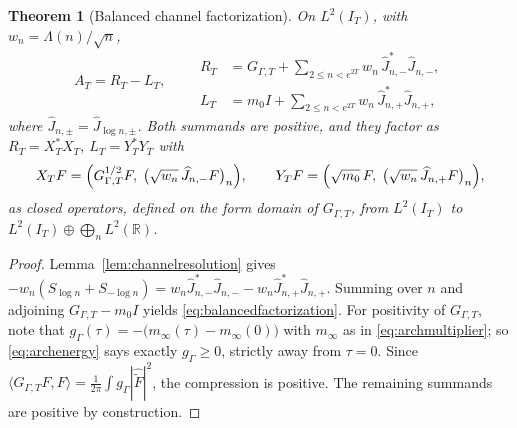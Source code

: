 \documentclass[11pt]{amsart}
\newtheorem{theorem}{Theorem}[section]
\theoremstyle{definition}
\theoremstyle{remark}
\newcommand{\R}{\mathbb R}
\begin{document}
\begin{theorem}[Balanced channel factorization]\label{thm:balancedfactorization}
On \(L^2(I_T)\), with \(w_n=\Lambda(n)/\sqrt n\),
\begin{equation}\label{eq:balancedfactorization}
 A_T=R_T-L_T,
 \qquad
 \begin{aligned}
 R_T&=G_{\Gamma,T}+\sum_{2\le n<e^{2T}}w_n\,
      \widehat J_{n,-}^*\widehat J_{n,-},\\
 L_T&=m_0I+\sum_{2\le n<e^{2T}}w_n\,
      \widehat J_{n,+}^*\widehat J_{n,+},
 \end{aligned}
\end{equation}
where \(\widehat J_{n,\pm}=\widehat J_{\log n,\pm}\).  Both summands are
positive, and they factor as \(R_T=X_T^*X_T\), \(L_T=Y_T^*Y_T\) with
\begin{equation}\label{eq:referenceloadcolumns}
 X_TF=\Bigl(G_{\Gamma,T}^{1/2}F,\;
      \bigl(\sqrt{w_n}\,\widehat J_{n,-}F\bigr)_n\Bigr),
 \qquad
 Y_TF=\Bigl(\sqrt{m_0}\,F,\;
      \bigl(\sqrt{w_n}\,\widehat J_{n,+}F\bigr)_n\Bigr),
\end{equation}
as closed operators, defined on the form domain of \(G_{\Gamma,T}\), from
\(L^2(I_T)\) to \(L^2(I_T)\oplus\bigoplus_nL^2(\R)\).
\end{theorem}

\begin{proof}
Lemma~\ref{lem:channelresolution} gives
\(-w_n(S_{\log n}+S_{-\log n})
 =w_n\widehat J_{n,-}^*\widehat J_{n,-}-w_n\widehat J_{n,+}^*\widehat J_{n,+}\).
Summing over \(n\) and adjoining \(G_{\Gamma,T}-m_0I\) yields
\eqref{eq:balancedfactorization}.  For positivity of \(G_{\Gamma,T}\), note
that \(g_\Gamma(\tau)=-\bigl(m_\infty(\tau)-m_\infty(0)\bigr)\) with
\(m_\infty\) as in \eqref{eq:archmultiplier}; so \eqref{eq:archenergy} says
exactly \(g_\Gamma\ge0\), strictly away from \(\tau=0\).  Since
\(\langle G_{\Gamma,T}F,F\rangle
 =\frac1{2\pi}\int g_\Gamma|\widehat{\widetilde F}|^2\), the compression is
positive.  The remaining summands are positive by construction.
\end{proof}
\end{document}

